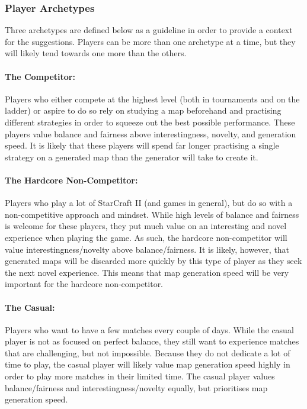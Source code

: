 \subsubsection{Player Archetypes}
Three archetypes are defined below as a guideline in order to provide a context for the suggestions. Players can be more than one archetype at a time, but they will likely tend towards one more than the others.

\paragraph{The Competitor:} Players who either compete at the highest level (both in tournaments and on the ladder) or aspire to do so rely on studying a map beforehand and practising different strategies in order to squeeze out the best possible performance. These players value balance and fairness above interestingness, novelty, and generation speed. It is likely that these players will spend far longer practising a single strategy on a generated map than the generator will take to create it.

\paragraph{The Hardcore Non-Competitor:} Players who play a lot of StarCraft II (and games in general), but do so with a non-competitive approach and mindset. While high levels of balance and fairness is welcome for these players, they put much value on an interesting and novel experience when playing the game. As such, the hardcore non-competitor will value interestingness/novelty above balance/fairness. It is likely, however, that generated maps will be discarded more quickly by this type of player as they seek the next novel experience. This means that map generation speed will be very important for the hardcore non-competitor.

\paragraph{The Casual:} Players who want to have a few matches every couple of days. While the casual player is not as focused on perfect balance, they still want to experience matches that are challenging, but not impossible. Because they do not dedicate a lot of time to play, the casual player will likely value map generation speed highly in order to play more matches in their limited time. The casual player values balance/fairness and interestingness/novelty equally, but prioritises map generation speed.

